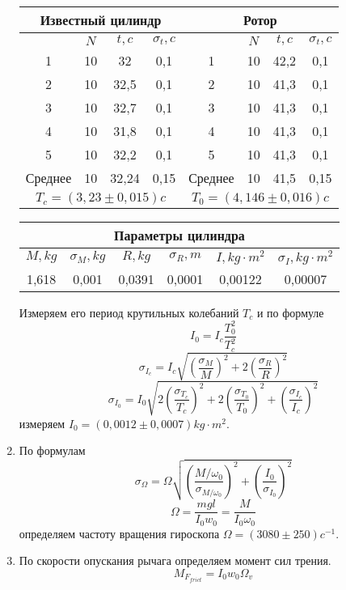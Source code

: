 \documentclass[a4paper, 12pt]{article}%
\begin{document}
\begin{enumerate}
\begin{center}
\begin{tabular}{|c|c|c|c||c|c|c|c|}
\hline
\multicolumn{4}{|c||}{Известный цилиндр}        & \multicolumn{4}{c|}{Ротор}             \\ \hline
           & $N$   & $t, c$   & $\sigma_t, c$  &         & $N$ & $t, c$ & $\sigma_t, c$ \\ \hline
1          & 10    & 32       & 0,1            & 1       & 10  & 42,2   & 0,1           \\ \hline
2          & 10    & 32,5     & 0,1            & 2       & 10  & 41,3   & 0,1           \\ \hline
3          & 10    & 32,7     & 0,1            & 3       & 10  & 41,3   & 0,1           \\ \hline
4          & 10    & 31,8     & 0,1            & 4       & 10  & 41,3   & 0,1           \\ \hline
5          & 10    & 32,2     & 0,1            & 5       & 10  & 41,3   & 0,1           \\ \hline
Среднее    & 10    & 32,24    & 0,15           & Среднее & 10  & 41,5   & 0,15          \\ \hline
\multicolumn{4}{|c||}{$T_c = (3,23 \pm 0,015) c$} & \multicolumn{4}{c|}{$T_0 = (4,146 \pm 0,016) c$} \\ \hline
\end{tabular}
\begin{tabular}{|c|c|c|c|c|c|}
\hline
\multicolumn{6}{|c|}{Параметры цилиндра}                                                          \\ \hline
$M, kg$ & $\sigma_M, kg$ & $R, kg$ & $\sigma_R, m$ & $I, kg \cdot m^2$ & $\sigma_I, kg \cdot m^2$ \\ \hline
1,618   & 0,001          & 0,0391  & 0,0001        & 0,00122            & 0,00007                   \\ \hline
\end{tabular}
\end{center}
Измеряем его период крутильных колебаний $T_c$ и по формуле 
\[I_0 = I_c \dfrac{T_0^2}{T_c^2}\] 
\[\sigma_{I_c} =I_c \sqrt{  \left( \dfrac{\sigma_M }{M} \right)^2 + 2  \left( \dfrac{ \sigma_R }{R} \right) ^2 } \]
\[\sigma_{I_0} = I_0 \sqrt{ 2 \left( \dfrac{\sigma_{T_c}}{T_c} \right) ^2 + 2 \left( \dfrac{\sigma_{T_0}}{T_0} \right) ^2 +  \left( \dfrac{\sigma_{I_c}}{I_c} \right) ^2}\]
измеряем $I_0 = (0,0012 \pm 0,0007) kg \cdot m^2$.
\item По формулам
\[\sigma_{\Omega} = \Omega \sqrt{\left( \dfrac{M/ \omega_0}{\sigma_{M/ \omega_0}} \right) ^2 + \left( \dfrac{I_0}{ \sigma_{I_0} } \right) ^2 }\]
\[\Omega = \dfrac{mgl}{I_0 w_0} = \dfrac{M}{I_0 \omega_0}\]
определяем частоту вращения гироскопа $\Omega = (3080 \pm 250) c^{-1}$.
\item По скорости опускания рычага определяем момент сил трения. 
\[M_{F_{frict}} = I_0 w_0 \Omega_{v} \]


\end{enumerate}
\end{document}
